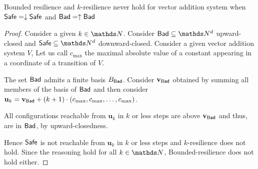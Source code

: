 \begin{proposition}
{\sc Bounded resilience} and {\sc $k$-resilience} never hold for vector addition system when $\textsf{Safe} = \downarrow \textsf{Safe}$ and $\textsf{Bad} = \uparrow \textsf{Bad}$
\end{proposition}


\begin{proof}
Consider a given $k \in \N$.
Consider $\Bad \subseteq \N^d$ upward-closed and $\Safe \subseteq \N^d$ downward-closed.
Consider a given vector addition system $V$, 
Let us call $c_{\max}$ the maximal absolute value of a constant appearing in a coordinate of a transition of $V$.

The set $\Bad$ admits a finite basis $B_{\textsf{Bad}}$.
Consider $\textbf{v}_{\textsf{Bad}}$ obtained by summing all members of the basis of $\Bad$ and then consider 
$\textbf{u}_k = \textbf{v}_{\textsf{Bad}} + (k+1) \cdot (c_{\max}, c_{\max}, \ldots, c_{\max})$.

All configurations reachable from $\textbf{u}_k$ in $k$ or less steps are above $ \textbf{v}_{\textsf{Bad}} $
and thus, are in $\Bad$, by upward-closedness.

Hence  $\Safe$ is not reachable from $\textbf{u}_k$ in $k$ or less steps  and {$k$-resilience} does not hold.
Since the reasoning hold for all $k \in \N$, {\sc Bounded-resilience} does not hold either.
\end{proof}

\iffalse
\mathieu{
resilience never hold in the case of VAS. 
What happens when you add states ? \\
So you consider for instance $q_0(u_k)$ instead of just $u_k$. \\
Everything reachable from $q_0(u_k)$ is still of the form $q(u)$ with u greater than $v_{\Bad}$
(we'd have $v_{\Bad}$ sum of the coordinate of the elements from the basis of $\Bad$ when not considering states).
So now, let us fix some state $q$.
Either there is an element of the basis of $\Bad$ with state $q$.
Then $q(u)$ is necessarily in $\Bad$ (If this hold for all $q \in Q$, then again $k$-resilience does not hold).
Either there is none.
If there is none, then $q(\omega)$ is in the complement of $\Bad$, i.e. $\Safe$.
Then, of course there are probably other elements in $\Safe$ but from
the perspective of $\Bad$ and the extremely high elements $q_i(u_k)$  these ‘smaller’ elements are all but unreachable. 
And the question becomes rather `can we reach $q(\omega)$ from every element of $\Bad$ save from maybe the few smaller ones ?’
Since $q(\omega)$ here is upward-closed this is decidable i.e. it is asking coverability questions. 
It’s not 100\% the question «asking, for every element in the basis of $\Bad$, whether or not $q(0)$ is coverable from it», since you could have, for smaller elements in $\Bad$, other elements of $\Safe$ you can reach, but it seem close.
This would lead to a decision scheme.
Need to write this more formally/properly.}
\fi

